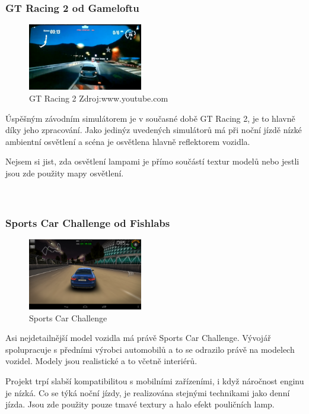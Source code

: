 \documentclass[11pt,twoside,a4paper]{book}
\begin{document}
\subsubsection{GT Racing 2 od Gameloftu}
\begin{figure}
  \includegraphics[width=50mm]{figures/games/gt2.png}
  \caption{GT Racing 2 Zdroj:www.youtube.com}
\end{figure}
Úspěšným závodním simulátorem je v současné době GT Racing 2, je to hlavně díky jeho zpracování. Jako jediný\linebreak z uvedených simulátorů má při noční jízdě nízké ambientní osvětlení a scéna je osvětlena hlavně reflektorem vozidla.

Nejsem si jist, zda osvětlení lampami je přímo součástí textur modelů nebo jestli jsou zde použity mapy osvětlení.
\\ \\ \\

\subsubsection{Sports Car Challenge od Fishlabs}
\begin{figure}
  \includegraphics[width=50mm]{figures/games/scc.png}
  \caption{Sports Car Challenge}
\end{figure}
Asi nejdetailnější model vozidla má právě Sports Car Challenge. Vývojář spolupracuje s předními výrobci automobilů a to se odrazilo právě na modelech vozidel. Modely jsou realistické a to včetně interiérů.

Projekt trpí slabší kompatibilitou s mobilními zařízeními, i když náročnost enginu je nízká. Co se týká noční jízdy, je realizována stejnými technikami jako denní jízda. Jsou zde použity pouze tmavé textury a halo efekt pouličních lamp.
\\ \\
\end{document}
